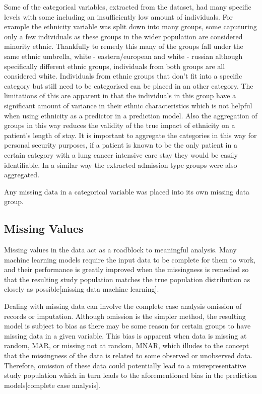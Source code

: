\documentclass[11pt]{article}
\begin{document}
Some of the categorical variables, extracted from the dataset, had many specific levels with some including an insufficiently low amount of individuals. For example the ethnicity variable was split down into many groups, some caputuring only a few individuals as these groups in the wider population are considered minority ethnic. Thankfully to remedy this many of the groups fall under the same ethnic umbrella, white - eastern/european and white - russian although specifically different ethnic groups, individuals from both groups are all considered white. Individuals from ethnic groups that don't fit into a specific category but still need to be categorised can be placed in an other category. The limitations of this are apparent in that the individuals in this group have a significant amount of variance in their ethnic characteristics which is not helpful when using ethnicity as a predictor in a prediction model. Also the aggregation of groups in this way reduces the validity of the true impact of ethnicity on a patient's length of stay. It is important to aggregate the categories in this way for personal security purposes, if a patient is known to be the only patient in a certain category with a lung cancer intensive care stay they would be easily identifiable. In a similar way the extracted admission type groups were also aggregated.

Any missing data in a categorical variable was placed into its own missing data group.

\subsection{Missing Values}
Missing values in the data act as a roadblock to meaningful analysis. Many machine learning models require the input data to be complete for them to work, and their performance is greatly improved when the missingness is remedied so that the resulting study population matches the true population distribution as closely as possible[missing data machine learning].

Dealing with missing data can involve the complete case analysis omission of records or imputation. Although omission is the simpler method, the resulting model is subject to bias as there may be some reason for certain groups to have missing data in a given variable. This bias is apparent when data is missing at random, MAR, or missing not at random, MNAR, which illudes to the concept that the missingness of the data is related to some observed or unobserved data. Therefore, omission of these data could potentially lead to a misrepresentative study population which in turn leads to the aforementioned bias in the prediction models[complete case analysis].
\end{document}
